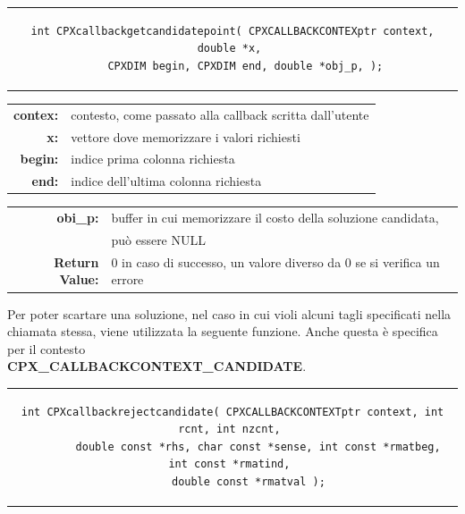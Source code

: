 \begin{center}
\begin{tabular}{c}
\begin{lstlisting}[linewidth=380pt, basicstyle=\footnotesize\sffamily,]
int CPXcallbackgetcandidatepoint( CPXCALLBACKCONTEXptr context, double *x, 
		CPXDIM begin, CPXDIM end, double *obj_p, );    
\end{lstlisting}
\end{tabular}
\end{center}
\begin{table}[h]
\centering
\begin{tabular}{rl}
\textbf{contex:} & {contesto, come passato alla callback scritta dall'utente}\\
\textbf{x:} & {vettore dove memorizzare i valori richiesti}\\
\textbf{begin:} & {indice prima colonna richiesta}\\
\textbf{end:} & {indice dell'ultima colonna richiesta}\\
\end{tabular}
\end{table}
\begin{table}[h]
\centering
\begin{tabular}{rl}
\textbf{obi\_p:} & {buffer in cui memorizzare il costo della soluzione candidata,}\\
&{può essere NULL}\\
\textbf{Return Value:} & {0 in caso di successo, un valore diverso da 0 se si verifica un errore}\\
\end{tabular}
\end{table}
Per poter scartare una soluzione, nel caso in cui violi alcuni tagli specificati nella chiamata stessa, viene utilizzata la seguente funzione. Anche questa è specifica per il contesto 
\\\textbf{CPX\_CALLBACKCONTEXT\_CANDIDATE}.
\begin{center}
\begin{tabular}{c}
\begin{lstlisting}[linewidth=420pt, basicstyle=\footnotesize\sffamily,] 
int CPXcallbackrejectcandidate( CPXCALLBACKCONTEXTptr context, int rcnt, int nzcnt, 
		double const *rhs, char const *sense, int const *rmatbeg, int const *rmatind, 
		double const *rmatval );   
\end{lstlisting}
\end{tabular}
\end{center}
